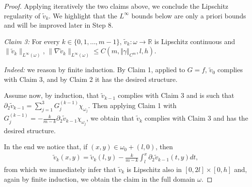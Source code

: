 \documentclass[a4paper, 10pt, twoside, notitlepage]{amsart}
\theoremstyle{plain}
\newcommand{\R}{\mathbb{R}}
\newcommand{\p}{\partial}
\begin{document}
\begin{proof}
\smallskip

Applying iteratively the two claims above, we conclude the Lipschitz regularity of $\tilde{v}_k$.
We highlight that the $L^\infty$ bounds below are only a priori bounds and will be improved later in Step 8.

\smallskip

\emph{Claim 3:} For every $k\in \{0,1,\dots,m-1\}$, $\tilde v_k:\omega\to\R$ is Lipschitz continuous and $\|\tilde v_k\|_{L^\infty(\omega)}$, $\|\nabla\tilde v_k\|_{L^\infty(\omega)}\leq C(m,\Vert \gamma \Vert_{C^m},l,h)$.

\smallskip

\emph{Indeed:} we reason by finite induction. By Claim 1, applied to $G=f$, $\tilde v_0$ complies with Claim 3, and by Claim 2 it has the desired structure.

Assume now, by induction, that $\tilde v_{k-1}$ complies with Claim 3 and is such that $\p_2 \tilde{v}_{k-1}= \sum_{j=1}^3 G_j^{(k-1)}\chi_{\omega_j}$.
Then applying Claim 1 with $G^{(k-1)}_j=-\frac{k}{m-k}\p_2\tilde v_{k-1} \chi_{\omega_j}$, we obtain that $\tilde v_k$ complies with Claim 3 and has the desired structure.

In the end we notice that, if $(x,y)\in\omega_0+(l,0)$, then
\begin{align*}
\tilde v_k(x,y)=\tilde v_k(l,y)-\frac{k}{m-k}\int_l^x\p_2\tilde v_{k-1}(t,y)dt,
\end{align*}
from which we immediately infer that $\tilde v_k$ is Lipschitz also in $[0,2l]\times[0,h]$ and, again by finite induction, we obtain the claim in the full domain $\omega$.







\end{proof}
\end{document}
